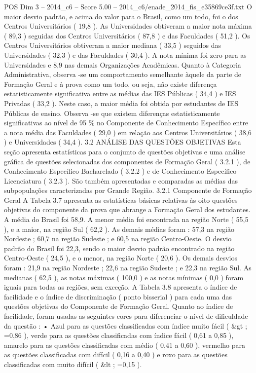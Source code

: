 \begin{textsample}{POS Dim 3 – 2014\_c6 – Score 5.00 – 2014\_c6/enade\_2014\_fis\_e35869ce3f.txt}
O maior desvio padrão, e acima do valor para o Brasil, como um todo, foi o dos Centros Universitários ( 19,8 ).
As Universidades obtiveram a maior nota máxima ( 89,3 ) seguidas dos Centros Universitários ( 87,8 ) e das Faculdades ( 51,2 ).
Os Centros Universitários obtiveram a maior mediana ( 33,5 ) seguidos das Universidades ( 32,3 ) e das Faculdades ( 30,4 ).
A nota mínima foi zero para as Universidades e 8,9 nas demais Organizações Acadêmicas.
Quanto à Categoria Administrativa, observa -se um comportamento semelhante àquele da parte de Formação Geral e à prova como um todo, ou seja, não existe diferença estatisticamente significativa entre as médias das IES Públicas ( 34,4 ) e IES Privadas ( 33,2 ).
Neste caso, a maior média foi obtida por estudantes de IES Públicas de ensino.
Observa -se que existem diferenças estatisticamente significativas ao nível de 95 \% no Componente de Conhecimento Específico entre a nota média das Faculdades ( 29,0 ) em relação aos Centros Universitários ( 38,6 ) e Universidades ( 34,4 ). 3.2 ANÁLISE DAS QUESTÕES OBJETIVAS Esta seção apresenta estatísticas para o conjunto de questões objetivas e uma análise gráfica de questões selecionadas dos componentes de Formação Geral ( 3.2.1 ), de Conhecimento Específico Bacharelado ( 3.2.2 ) e de Conhecimento Específico Licenciatura ( 3.2.3 ).
São também apresentadas e comparadas as médias das subpopulações caracterizadas por Grande Região. 3.2.1 Componente de Formação Geral A Tabela 3.7 apresenta as estatísticas básicas relativas às oito questões objetivas do componente da prova que abrange a Formação Geral dos estudantes.
A média do Brasil foi 58,9.
A menor média foi encontrada na região Norte ( 55,5 ), e a maior, na região Sul ( 62,2 ).
As demais médias foram : 57,3 na região Nordeste ; 60,7 na região Sudeste ; e 60,5 na região Centro-Oeste.
O desvio padrão do Brasil foi 22,3, sendo o maior desvio padrão encontrado na região Centro-Oeste ( 24,5 ), e o menor, na região Norte ( 20,6 ).
Os demais desvios foram : 21,9 na região Nordeste ; 22,6 na região Sudeste ; e 22,3 na região Sul.
As medianas ( 62,5 ), as notas máximas ( 100,0 ) e as notas mínimas ( 0,0 ) foram iguais para todas as regiões, sem exceção.
A Tabela 3.8 apresenta o índice de facilidade e o índice de discriminação ( ponto bisserial ) para cada uma das questões objetivas do Componente de Formação Geral.
Quanto ao índice de facilidade, foram usadas as seguintes cores para diferenciar o nível de dificuldade da questão : • Azul para as questões classificadas com índice muito fácil ( \&gt ; =0,86 ), verde para as questões classificadas com índice fácil ( 0,61 a 0,85 ), amarelo para as questões classificadas com médio ( 0,41 a 0,60 ), vermelho para as questões classificadas com difícil ( 0,16 a 0,40 ) e roxo para as questões classificadas com muito difícil ( \&lt ; =0,15 ).

\end{textsample}
